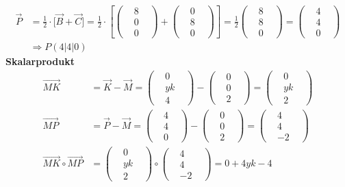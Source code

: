 \documentclass[a4 paper, 12pt]{report}
\theoremstyle{plain}
\begin{document}
\begin{align*}
\stackrel{\longrightarrow}{P}& = \frac{1}{2}\cdot \bigg[\stackrel{\longrightarrow}{B}+\stackrel{\longrightarrow}{C}\bigg] = \frac{1}{2}\cdot\left[
\begin{pmatrix}
&8&\\&0&\\&0&
\end{pmatrix}
+
\begin{pmatrix}
&0&\\&8&\\&0&
\end{pmatrix}
\right]
 = \frac{1}{2}
\begin{pmatrix}
&8&\\&8&\\&0&
\end{pmatrix}
= 
\begin{pmatrix}
&4&\\&4&\\&0&
\end{pmatrix}\\
&\Longrightarrow P(4|4|0)
\end{align*}
\textbf{Skalarprodukt}
\begin{align*}
\stackrel{\longrightarrow}{MK} &= \stackrel{\longrightarrow}{K}-\stackrel{\longrightarrow}{M} = 
\begin{pmatrix}
&0&\\
&yk&\\
&4&
\end{pmatrix}
-
\begin{pmatrix}
&0&\\
&0&\\
&2&
\end{pmatrix}
=
\begin{pmatrix}
&0&\\
&yk&\\
&2&
\end{pmatrix}\\
\stackrel{\longrightarrow}{MP}& = \stackrel{\longrightarrow}{P}-\stackrel{\longrightarrow}{M} = \begin{pmatrix}&4&\\&4&\\&0&\end{pmatrix}-\begin{pmatrix}&0&\\&0&\\&2&\end{pmatrix} =  \begin{pmatrix}&4&\\&4&\\&-2&\end{pmatrix}\\
\stackrel{\longrightarrow}{MK}\circ \stackrel{\longrightarrow}{MP}& = 
\begin{pmatrix}
&0&\\
&yk&\\
&2&
\end{pmatrix}
\circ
\begin{pmatrix}
&4&\\&4&\\&-2&
\end{pmatrix} = 0+4yk-4
\end{align*}
\end{document}
